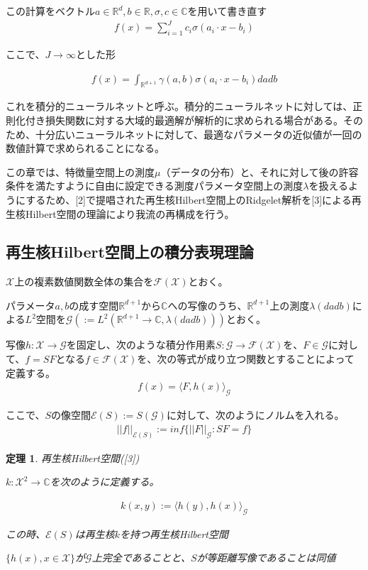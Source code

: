\documentclass{jsarticle}
\newtheorem{theo}{定理}[section]
\begin{document}
この計算をベクトル$a\in\mathbb{R}^d,b\in\mathbb{R},\sigma,c\in\mathbb{C}$を用いて書き直す
\begin{align}
f(x)=\sum^J_{i=1}c_i\sigma(a_i\cdot x-b_i)
\end{align}

ここで、$J\to\infty$とした形

\begin{align}
f(x)=\int_{\mathbb{R}^{d+1}}\gamma(a,b)\sigma(a_i\cdot x-b_i)dadb
\end{align}

これを積分的ニューラルネットと呼ぶ。積分的ニューラルネットに対しては、正則化付き損失関数に対する大域的最適解が解析的に求められる場合がある。そのため、十分広いニューラルネットに対して、最適なパラメータの近似値が一回の数値計算で求められることになる。



この章では、特徴量空間上の測度$\mu$（データの分布）と、それに対して後の許容条件を満たすように自由に設定できる測度パラメータ空間上の測度$\lambda$を扱えるようにするため、[2]で提唱された再生核Hilbert空間上のRidgelet解析を[3]による再生核Hilbert空間の理論により我流の再構成を行う。

\subsection{再生核Hilbert空間上の積分表現理論}

$\mathcal{X}$上の複素数値関数全体の集合を$\mathcal{F}(\mathcal{X})$とおく。

パラメータ$a,b$の成す空間$\mathbb{R}^{d+1}$から$\mathbb{C}$への写像のうち、$\mathbb{R}^{d+1}$上の測度$\lambda(dadb)$による$L^2$空間を$\mathcal{G}(:=L^2(\mathbb{R}^{d+1}\to\mathbb{C},\lambda(dadb)))$とおく。

写像$h:\mathcal{X}\to\mathcal{G}$を固定し、次のような積分作用素$S:\mathcal{G}\to\mathcal{F}(\mathcal{X})$を、$F\in\mathcal{G}$に対して、$f=SF$となる$f\in\mathcal{F}(\mathcal{X})$を、次の等式が成り立つ関数とすることによって定義する。
\begin{align}
f(x)=\langle F,h(x)\rangle_\mathcal{G}
\end{align}

ここで、$S$の像空間$\mathcal{E}(S):=S(\mathcal{G})$に対して、次のようにノルムを入れる。
\begin{align}
||f||_{\mathcal{E}(S)}:=inf\{||F||_\mathcal{G}:SF=f\}
\end{align}


\begin{theo} 再生核Hilbert空間([3])

$k:\mathcal{X}^2\to\mathbb{C}$を次のように定義する。

\begin{align}
k(x,y):=\langle h(y),h(x)\rangle_\mathcal{G}
\end{align}

この時、$\mathcal{E}(S)$は再生核$k$を持つ再生核Hilbert空間

$\{h(x),x\in\mathcal{X}\}$が$\mathcal{G}$上完全であることと、$S$が等距離写像であることは同値

\end{theo}
\end{document}
